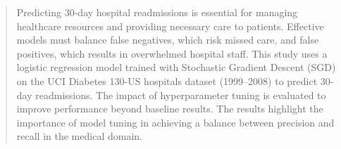 \begin{abstract}
Predicting 30-day hospital readmissions is essential for managing healthcare resources and providing necessary care to patients. Effective models must balance false negatives, which risk 
missed care, and false positives, which results in overwhelmed hospital staff. This study uses a logistic regression model trained with Stochastic Gradient Descent (SGD) on the 
UCI Diabetes 130-US hospitals dataset (1999–2008) to predict 30-day readmissions. The impact of hyperparameter tuning is evaluated to improve performance beyond baseline 
results. The results highlight the importance of model tuning in achieving a balance between precision and recall in the medical domain.
\end{abstract}